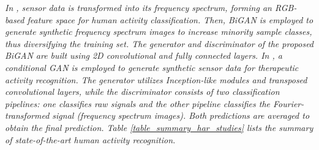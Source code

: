 \documentclass[preprint,12pt]{elsarticle}
\begin{document}
\emph{In \citep{kia_human_2024}, sensor data is transformed into its frequency spectrum, forming an RGB-based feature space for human activity classification. Then, BiGAN is employed to generate synthetic frequency spectrum images to increase minority sample classes, thus diversifying the training set. The generator and discriminator of the proposed BiGAN are built using 2D convolutional and fully connected layers. In \citep{mohammadzadeh_cgan-based_2025}, a conditional GAN is employed to generate synthetic sensor data for therapeutic activity recognition. The generator utilizes Inception-like modules and transposed convolutional layers, while the discriminator consists of two classification pipelines: one classifies raw signals and the other pipeline classifies the Fourier-transformed signal (frequency spectrum images). Both predictions are averaged to obtain the final prediction. Table \ref{table_summary_har_studies} lists the summary of state-of-the-art human activity recognition.}
\end{document}
